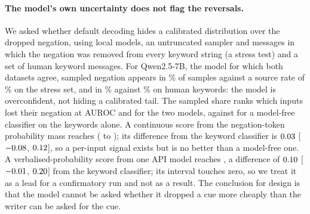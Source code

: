 \paragraph{The model's own uncertainty does not flag the reversals.}
We asked whether default decoding hides a calibrated distribution over the dropped negation, using \jmknsModels{} local models, an untruncated sampler and \jmknsUnitsCap{} messages in which the negation was removed from every keyword string (a stress test) and a set of human keyword messages. %
For Qwen2.5-7B, the model for which both datasets agree, sampled negation appears in \jmknsCapSampled{}\% of samples against a source rate of \jmknsCapTarget{}\% on the stress set, and in \jmknsHumSampled{}\% against \jmknsHumTarget{}\% on human keywords: the model is overconfident, not hiding a calibrated tail.
The sampled share ranks which inputs lost their negation at AUROC \jmknsAucKOneSixQwen{} and \jmknsAucKOneSixLlama{} for the two models, against \jmknsAucLex{} for a model-free classifier on the keywords alone.
A continuous score from the negation-token probability mass reaches \jmknsAucNegmass{} (\jmknsAucNegmassLo{} to \jmknsAucNegmassHi{}); its difference from the keyword classifier is $0.03$ [$-0.08$, $0.12$], so a per-input signal exists but is no better than a model-free one.
A verbalised-probability score from one API model reaches \jmknsAucTerraVerbal{}, a difference of $0.10$ [$-0.01$, $0.20$] from the keyword classifier; its interval touches zero, so we treat it as a lead for a confirmatory run and not as a result.
The conclusion for design is that the model cannot be asked whether it dropped a cue more cheaply than the writer can be asked for the cue.

